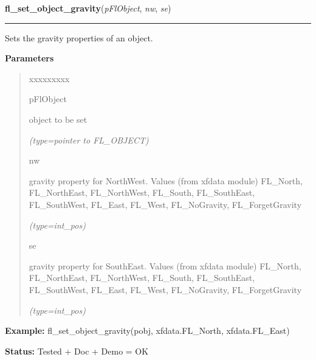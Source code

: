 \hspace{.8\funcindent}\begin{boxedminipage}{\funcwidth}

    \raggedright \textbf{fl\_set\_object\_gravity}(\textit{pFlObject}, \textit{nw}, \textit{se})

    \vspace{-1.5ex}

    \rule{\textwidth}{0.5\fboxrule}
\setlength{\parskip}{2ex}
    Sets the gravity properties of an object.

\setlength{\parskip}{1ex}
      \textbf{Parameters}
      \vspace{-1ex}

      \begin{quote}
        \begin{Ventry}{xxxxxxxxx}

          \item[pFlObject]

          object to be set

            {\it (type=pointer to FL\_OBJECT)}

          \item[nw]

          gravity property for NorthWest. Values (from xfdata module) 
          FL\_North, FL\_NorthEast, FL\_NorthWest, FL\_South, 
          FL\_SouthEast, FL\_SouthWest, FL\_East, FL\_West, FL\_NoGravity, 
          FL\_ForgetGravity

            {\it (type=int\_pos)}

          \item[se]

          gravity property for SouthEast. Values (from xfdata module) 
          FL\_North, FL\_NorthEast, FL\_NorthWest, FL\_South, 
          FL\_SouthEast, FL\_SouthWest, FL\_East, FL\_West, FL\_NoGravity, 
          FL\_ForgetGravity

            {\it (type=int\_pos)}

        \end{Ventry}

      \end{quote}

\textbf{Example:} fl\_set\_object\_gravity(pobj, xfdata.FL\_North, xfdata.FL\_East)



\textbf{Status:} Tested + Doc + Demo = OK



    \end{boxedminipage}

